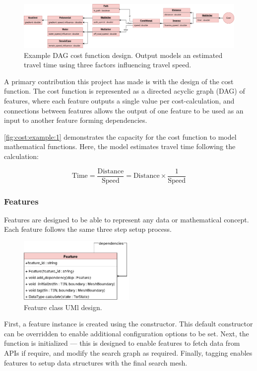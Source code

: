 \documentclass[12pt]{article}
\begin{document}
\begin{figure}[!htbp]
  \centering
  \includegraphics[width=\textwidth]{assets/costfunction-example1.png}
  \caption{Example DAG cost function design. Output models an estimated travel time using three factors influencing travel speed.}\label{fig:cost:example:1}
\end{figure}

A primary contribution this project has made is with the design of the cost function. The cost function is represented as a directed acyclic graph (DAG) of features, where each feature outputs a single value per cost-calculation, and connections between features allows the output of one feature to be used as an input to another feature forming dependencies.


\autoref{fig:cost:example:1} demonstrates the capacity for the cost function to model mathematical functions. Here, the model estimates travel time following the calculation:

\[\text{Time} = \frac{\text{Distance}}{\text{Speed}} = \text{Distance} \times \frac{1}{\text{Speed}}\]

\subsubsection{Features}

Features are designed to be able to represent any data or mathematical concept. Each feature follows the same three step setup process.

\begin{figure}[!htbp]
  \includegraphics[width=0.5\textwidth]{assets/feature.png}
  \centering
  \caption{Feature class UMl design.}\label{fig:feature}
\end{figure}

First, a feature instance is created using the constructor. This default constructor can be overridden to enable additional configuration options to be set. Next, the function is initialized --- this is designed to enable features to fetch data from APIs if require, and modify the search graph as required. Finally, tagging enables features to setup data structures with the final search mesh.
\end{document}
